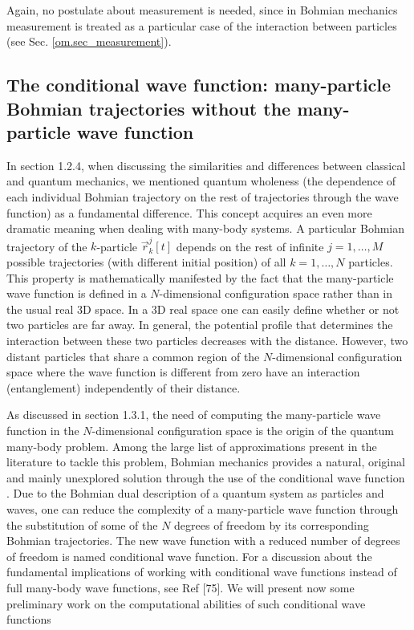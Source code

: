 \documentclass[onecolumn,nofootinbib, secnumarabic, amsmath, nobibnotes,12pt,aps,pra]{revtex4-1}
\newcommand{\sref}[1]{Sec. \ref{#1}}
\begin{document}
Again, no postulate about measurement is needed, since in Bohmian
mechanics measurement is treated as a particular case of the
interaction between particles (see \sref{om.sec_measurement}).

\subsection{The conditional wave function: many-particle Bohmian trajectories without the many-particle wave function}\label{om.sec_many.6}

In section 1.2.4, when discussing the similarities and differences
between classical and quantum mechanics, we mentioned quantum
wholeness (the dependence of each individual Bohmian trajectory on
the rest of trajectories through the wave function) as a fundamental
difference. This concept acquires an even more dramatic meaning when
dealing with many-body systems. A particular Bohmian trajectory of
the $k$-particle $\vec r_k^j[t]$ depends on the rest of infinite $j = 1, \ldots, M$ possible
trajectories (with different initial position) of all $k = 1,\ldots, N$
particles. This property is mathematically manifested by the fact
that the many-particle wave function is defined in a $N$-dimensional
configuration space rather than in the usual real 3D space. In a 3D
real space one can easily define whether or not two particles are
far away. In general, the potential profile that determines the
interaction between these two particles decreases with the distance.
However, two distant particles that share a common region of the
$N$-dimensional configuration space where the wave function is
different from zero have an interaction (entanglement) independently
of their distance.

As discussed in section 1.3.1, the need of computing the
many-particle wave function in the $N$-dimensional configuration
space is the origin of the quantum many-body problem. Among the
large list of approximations present in the literature to tackle
this problem, Bohmian mechanics provides a natural, original and
mainly unexplored solution through the use of the conditional wave
function \cite{om.norsen}. Due to the Bohmian dual description of a quantum
system as particles and waves, one can reduce the complexity of a
many-particle wave function through the substitution of  some of the
$N$ degrees of freedom by its corresponding Bohmian trajectories.
The new wave function with a reduced number of degrees of freedom is
named conditional wave function.  For a discussion about the
fundamental implications of working with conditional wave functions
instead of full many-body wave functions, see Ref [75]. We will
present now  some preliminary work on the computational abilities of such
conditional wave functions
\end{document}
